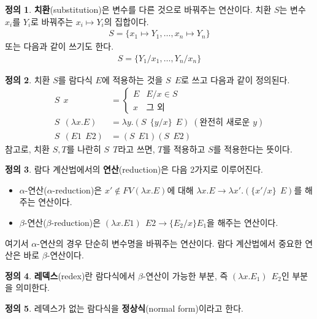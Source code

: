 \documentclass[b5paper, 11pt]{book}
\theoremstyle{definition}
\newtheorem{defn}{정의}[chapter]
\begin{document}
\begin{defn}
    \textbf{치환}(substitution)은 변수를 다른 것으로 바꿔주는 연산이다. 치환 $S$는 변수 $x_i$를
    $Y_i$로 바꿔주는 $x_i \mapsto Y_i$의 집합이다.
    \begin{align*}
        S = \{ x_1 \mapsto Y_1, \ldots, x_n \mapsto Y_n\}
    \end{align*}
    또는 다음과 같이 쓰기도 한다.
    \begin{align*}
        S = \{ Y_1 / x_1, \ldots, Y_n / x_n \}
    \end{align*}
\end{defn}
\begin{defn}
    치환 $S$를 람다식 $E$에 적용하는 것을 $S \;\, E$로 쓰고 다음과 같이 정의된다.
    \begin{align*}
        S \;\, x &= 
            \begin{cases}
                E & E/x \in S \\
                x & \text{그 외} 
            \end{cases}  \\ 
        S \;\, (\lambda x. E) &= \lambda y. (S \;\, \{ y/x\} \;\, E) \; (\text{완전히 새로운 } y) \\ 
        S \;\, (E1 \;\, E2) &= (S \;\, E1) (S \;\, E2) 
    \end{align*} 
    참고로, 치환 $S, T$를 나란히 $S \;\, T$라고 쓰면, $T$를 적용하고 $S$를 적용한다는 뜻이다.
\end{defn}
\begin{defn}
    람다 계산법에서의 \textbf{연산}(reduction)은 다음 2가지로 이루어진다.
    \begin{itemize}
        \item $\alpha$-연산($\alpha$-reduction)은 
        $x' \notin FV(\lambda x. E)$에 대해 
        $\lambda x. E \rightarrow \lambda x'. (\{x'/x\} \;\, E)$를 해주는 연산이다.
        \item $\beta$-연산($\beta$-reduction)은
        $(\lambda x. E1) \;\, E2 \rightarrow \{ E_2 / x\}E_1$을 해주는 연산이다.
    \end{itemize}
\end{defn}
여기서 $\alpha$-연산의 경우 단순히 변수명을 바꿔주는 연산이다. 람다 계산법에서 중요한 연산은 바로 $\beta$-연산이다. 
\begin{defn}
    \textbf{레덱스}(redex)란 람다식에서 $\beta$-연산이 가능한 부분, 즉 $( \lambda x. E_1 ) \;\, E_2$인 부분을 의미한다.
\end{defn}
\begin{defn}
    레덱스가 없는 람다식을 \textbf{정상식}(normal form)이라고 한다.
\end{defn}
\end{document}
